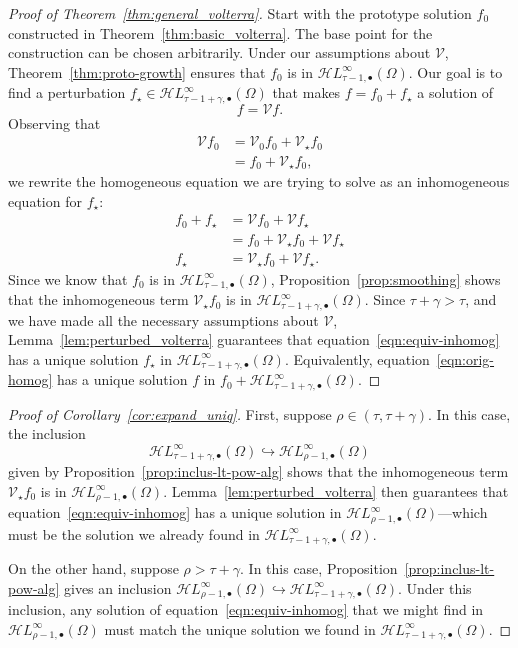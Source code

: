 \documentclass{article}
\theoremstyle{definition}
\theoremstyle{plain}
\newcommand{\singexp}[2]{\mathcal{H}L^\infty_{#1, #2}}
\newcommand{\singexpalg}[1]{\singexp{#1}{\bullet}}
\newcommand{\volterra}{\mathcal{V}}
\newcommand{\hardpart}{\mathcal{V}_0}
\newcommand{\softpart}{\mathcal{V}_\star}
\newcommand{\solwhole}{f}
\newcommand{\solproto}{f_0}
\newcommand{\solptb}{f_\star}
\newcommand{\domain}{\Omega}
\begin{document}
\begin{proof}[Proof of Theorem~\ref{thm:general_volterra}]
Start with the prototype solution $\solproto$ constructed in Theorem~\ref{thm:basic_volterra}. The base point for the construction can be chosen arbitrarily. Under our assumptions about $\volterra$, Theorem~\ref{thm:proto-growth} ensures that $\solproto$ is in $\singexpalg{\tau-1}(\domain)$. Our goal is to find a perturbation $\solptb \in \singexpalg{\tau-1+\gamma}(\domain)$ that makes $\solwhole = \solproto + \solptb$ a solution of 
\begin{equation}\label{eqn:orig-homog}
\solwhole = \volterra \solwhole.
\end{equation}
Observing that
\begin{align*}
\volterra \solproto & = \hardpart\solproto + \softpart\solproto \\
& = \solproto + \softpart \solproto,
\end{align*}
we rewrite the homogeneous equation we are trying to solve as an inhomogeneous equation for $\solptb$:
\begin{align}
\solproto + \solptb & = \volterra\solproto + \volterra\solptb \nonumber \\
& = \solproto + \softpart\solproto + \volterra\solptb \nonumber \\
\solptb & = \softpart\solproto + \volterra\solptb. \label{eqn:equiv-inhomog}
\end{align}
Since we know that $\solproto$ is in $\singexpalg{\tau-1}(\domain)$, Proposition~\ref{prop:smoothing} shows that the inhomogeneous term $\softpart\solproto$ is in $\singexpalg{\tau-1+\gamma}(\domain)$. Since $\tau+\gamma > \tau$, and we have made all the necessary assumptions about $\volterra$, Lemma~\ref{lem:perturbed_volterra} guarantees that equation~\eqref{eqn:equiv-inhomog} has a unique solution $\solptb$ in $\singexpalg{\tau-1+\gamma}(\Omega)$. Equivalently, equation~\eqref{eqn:orig-homog} has a unique solution $f$ in $f_0 + \singexpalg{\tau-1+\gamma}(\domain)$.
\end{proof}
\begin{proof}[Proof of Corollary~\ref{cor:expand_uniq}]
First, suppose $\rho \in (\tau, \tau+\gamma)$. In this case, the inclusion
\[\singexpalg{\tau-1+\gamma}(\Omega) \hookrightarrow \singexpalg{\rho-1}(\Omega)\]
given by Proposition~\ref{prop:inclus-lt-pow-alg} shows that the inhomogeneous term $\softpart\solproto$ is in $\singexpalg{\rho-1}(\Omega)$. Lemma~\ref{lem:perturbed_volterra} then guarantees that equation~\eqref{eqn:equiv-inhomog} has a unique solution in $\singexpalg{\rho-1}(\Omega)$---which must be the solution we already found in $\singexpalg{\tau-1+\gamma}(\Omega)$.

On the other hand, suppose $\rho > \tau+\gamma$. In this case, Proposition~\ref{prop:inclus-lt-pow-alg} gives an inclusion $\singexpalg{\rho-1}(\Omega) \hookrightarrow \singexpalg{\tau-1+\gamma}(\Omega)$. Under this inclusion, any solution of equation~\eqref{eqn:equiv-inhomog} that we might find in $\singexpalg{\rho-1}(\Omega)$ must match the unique solution we found in $\singexpalg{\tau-1+\gamma}(\Omega)$.
\end{proof}
\end{document}
